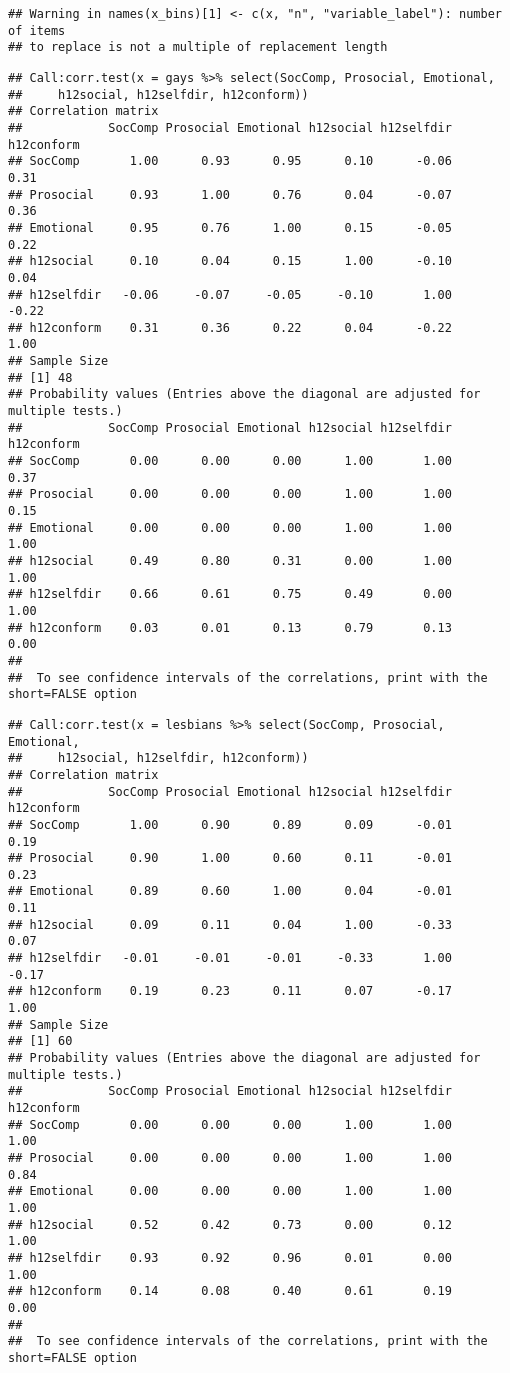 \documentclass[man]{apa6}
\begin{document}
\begin{verbatim}
## Warning in names(x_bins)[1] <- c(x, "n", "variable_label"): number of items
## to replace is not a multiple of replacement length
\end{verbatim}

\begin{verbatim}
## Call:corr.test(x = gays %>% select(SocComp, Prosocial, Emotional, 
##     h12social, h12selfdir, h12conform))
## Correlation matrix 
##            SocComp Prosocial Emotional h12social h12selfdir h12conform
## SocComp       1.00      0.93      0.95      0.10      -0.06       0.31
## Prosocial     0.93      1.00      0.76      0.04      -0.07       0.36
## Emotional     0.95      0.76      1.00      0.15      -0.05       0.22
## h12social     0.10      0.04      0.15      1.00      -0.10       0.04
## h12selfdir   -0.06     -0.07     -0.05     -0.10       1.00      -0.22
## h12conform    0.31      0.36      0.22      0.04      -0.22       1.00
## Sample Size 
## [1] 48
## Probability values (Entries above the diagonal are adjusted for multiple tests.) 
##            SocComp Prosocial Emotional h12social h12selfdir h12conform
## SocComp       0.00      0.00      0.00      1.00       1.00       0.37
## Prosocial     0.00      0.00      0.00      1.00       1.00       0.15
## Emotional     0.00      0.00      0.00      1.00       1.00       1.00
## h12social     0.49      0.80      0.31      0.00       1.00       1.00
## h12selfdir    0.66      0.61      0.75      0.49       0.00       1.00
## h12conform    0.03      0.01      0.13      0.79       0.13       0.00
## 
##  To see confidence intervals of the correlations, print with the short=FALSE option
\end{verbatim}

\begin{verbatim}
## Call:corr.test(x = lesbians %>% select(SocComp, Prosocial, Emotional, 
##     h12social, h12selfdir, h12conform))
## Correlation matrix 
##            SocComp Prosocial Emotional h12social h12selfdir h12conform
## SocComp       1.00      0.90      0.89      0.09      -0.01       0.19
## Prosocial     0.90      1.00      0.60      0.11      -0.01       0.23
## Emotional     0.89      0.60      1.00      0.04      -0.01       0.11
## h12social     0.09      0.11      0.04      1.00      -0.33       0.07
## h12selfdir   -0.01     -0.01     -0.01     -0.33       1.00      -0.17
## h12conform    0.19      0.23      0.11      0.07      -0.17       1.00
## Sample Size 
## [1] 60
## Probability values (Entries above the diagonal are adjusted for multiple tests.) 
##            SocComp Prosocial Emotional h12social h12selfdir h12conform
## SocComp       0.00      0.00      0.00      1.00       1.00       1.00
## Prosocial     0.00      0.00      0.00      1.00       1.00       0.84
## Emotional     0.00      0.00      0.00      1.00       1.00       1.00
## h12social     0.52      0.42      0.73      0.00       0.12       1.00
## h12selfdir    0.93      0.92      0.96      0.01       0.00       1.00
## h12conform    0.14      0.08      0.40      0.61       0.19       0.00
## 
##  To see confidence intervals of the correlations, print with the short=FALSE option
\end{verbatim}
\end{document}
